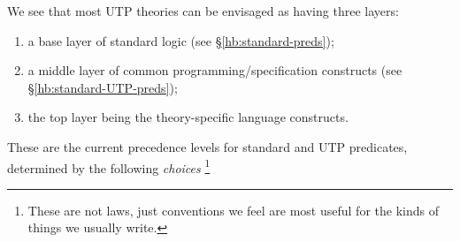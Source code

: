 \label{hb:pred}

We see that most UTP theories can be envisaged as having three
layers:
\begin{enumerate}
  \item a base layer of standard logic (see \S\ref{hb:standard-preds});
  \item a middle layer of common programming/specification constructs
     (see \S\ref{hb:standard-UTP-preds});
  \item the top layer being the theory-specific language constructs.
\end{enumerate}

These are the current precedence levels for standard and UTP predicates,
determined by the following \emph{choices}%
\footnote{These are not laws,
just conventions we feel are most useful
for the kinds of things we usually write.}%
